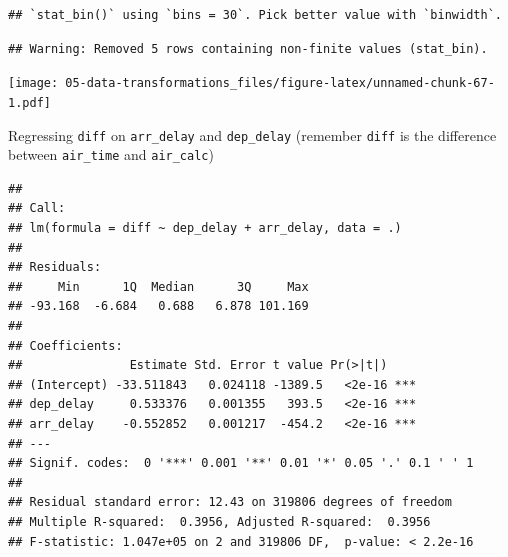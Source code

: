 \documentclass[]{book}
\newenvironment{Shaded}{\begin{snugshade}}{\end{snugshade}}
\newcommand{\DataTypeTok}[1]{\textcolor[rgb]{0.13,0.29,0.53}{#1}}
\newcommand{\KeywordTok}[1]{\textcolor[rgb]{0.13,0.29,0.53}{\textbf{#1}}}
\newcommand{\NormalTok}[1]{#1}
\newcommand{\OperatorTok}[1]{\textcolor[rgb]{0.81,0.36,0.00}{\textbf{#1}}}
\newcommand{\StringTok}[1]{\textcolor[rgb]{0.31,0.60,0.02}{#1}}
\theoremstyle{definition}
\theoremstyle{definition}
\theoremstyle{definition}
\theoremstyle{remark}
\begin{document}
\begin{verbatim}
## `stat_bin()` using `bins = 30`. Pick better value with `binwidth`.
\end{verbatim}

\begin{verbatim}
## Warning: Removed 5 rows containing non-finite values (stat_bin).
\end{verbatim}

\texttt{[image: 05-data-transformations\_files/figure-latex/unnamed-chunk-67-1.pdf]}

Regressing \texttt{diff} on \texttt{arr\_delay} and \texttt{dep\_delay}
(remember \texttt{diff} is the difference between \texttt{air\_time} and
\texttt{air\_calc})

\begin{Shaded}
\end{Shaded}

\begin{verbatim}
## 
## Call:
## lm(formula = diff ~ dep_delay + arr_delay, data = .)
## 
## Residuals:
##     Min      1Q  Median      3Q     Max 
## -93.168  -6.684   0.688   6.878 101.169 
## 
## Coefficients:
##               Estimate Std. Error t value Pr(>|t|)    
## (Intercept) -33.511843   0.024118 -1389.5   <2e-16 ***
## dep_delay     0.533376   0.001355   393.5   <2e-16 ***
## arr_delay    -0.552852   0.001217  -454.2   <2e-16 ***
## ---
## Signif. codes:  0 '***' 0.001 '**' 0.01 '*' 0.05 '.' 0.1 ' ' 1
## 
## Residual standard error: 12.43 on 319806 degrees of freedom
## Multiple R-squared:  0.3956, Adjusted R-squared:  0.3956 
## F-statistic: 1.047e+05 on 2 and 319806 DF,  p-value: < 2.2e-16
\end{verbatim}
\end{document}
